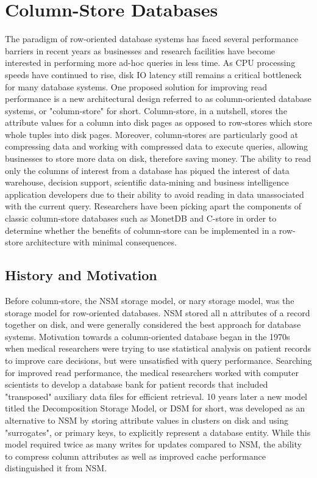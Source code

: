 \documentclass[11pt,a4paper]{report}
\begin{document}
\chapter{Column-Store Databases}
The paradigm of row-oriented database systems has faced several performance barriers in recent years as businesses and research facilities have become interested in performing more ad-hoc queries in less time. As CPU processing speeds have continued to rise, disk IO latency still remains a critical bottleneck for many database systems.\cite{stonebraker2005c} One proposed solution for improving read performance is a new architectural design referred to as column-oriented database systems, or "column-store" for short. Column-store, in a nutshell, stores the attribute values for a column into disk pages as opposed to row-stores which store whole tuples into disk pages. Moreover, column-stores are particularly good at compressing data and working with compressed data to execute queries, allowing businesses to store more data on disk, therefore saving money.\cite{abadi2006integrating} The ability to read only the columns of interest from a database has piqued the interest of data warehouse, decision support, scientific data-mining and business intelligence application developers due to their ability to avoid reading in data unassociated with the current query.\cite{harizopoulos2006performance, abadi2009column} Researchers have been picking apart the components of classic column-store databases such as MonetDB and C-store in order to determine whether the benefits of column-store can be implemented in a row-store architecture with minimal consequences.\cite{harizopoulos2006performance, bruno2009teaching,holloway2008read}

\section{History and Motivation}
Before column-store, the NSM storage model, or nary storage model, was the storage model for row-oriented databases. NSM stored all n attributes of a record together on disk, and were generally considered the best approach for database systems.\cite{copeland1985decomposition} Motivation towards a column-oriented database began in the 1970s when medical researchers were trying to use statistical analysis on patient records to improve care decisions, but were unsatisfied with query performance.\cite{weyl1975modular}  Searching for improved read performance, the medical researchers worked with computer scientists to develop a database bank for patient records that included "transposed" auxiliary data files for efficient retrieval. \cite{weyl1975modular} 10 years later a new model titled the Decomposition Storage Model, or DSM for short, was developed as an alternative to NSM by storing attribute values in clusters on disk and using "surrogates", or primary keys, to explicitly represent a database entity.\cite{copeland1985decomposition} While this model required twice as many writes for updates compared to NSM, the ability to compress column attributes as well as improved cache performance distinguished it from NSM.\cite{copeland1985decomposition} 
\end{document}
